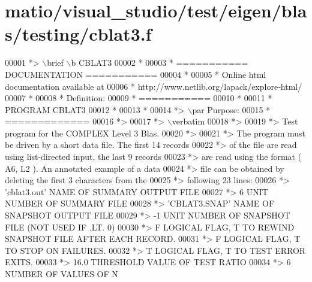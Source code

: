 \hypertarget{matio_2visual__studio_2test_2eigen_2blas_2testing_2cblat3_8f_source}{}\section{matio/visual\+\_\+studio/test/eigen/blas/testing/cblat3.f}
\label{matio_2visual__studio_2test_2eigen_2blas_2testing_2cblat3_8f_source}

\begin{DoxyCode}
00001 \textcolor{comment}{*> \(\backslash\)brief \(\backslash\)b CBLAT3}
00002 \textcolor{comment}{*}
00003 \textcolor{comment}{*  =========== DOCUMENTATION ===========}
00004 \textcolor{comment}{*}
00005 \textcolor{comment}{* Online html documentation available at }
00006 \textcolor{comment}{*            http://www.netlib.org/lapack/explore-html/ }
00007 \textcolor{comment}{*}
00008 \textcolor{comment}{*  Definition:}
00009 \textcolor{comment}{*  ===========}
00010 \textcolor{comment}{*}
00011 \textcolor{comment}{*       PROGRAM CBLAT3}
00012 \textcolor{comment}{* }
00013 \textcolor{comment}{*}
00014 \textcolor{comment}{*> \(\backslash\)par Purpose:}
00015 \textcolor{comment}{*  =============}
00016 \textcolor{comment}{*>}
00017 \textcolor{comment}{*> \(\backslash\)verbatim}
00018 \textcolor{comment}{*>}
00019 \textcolor{comment}{*> Test program for the COMPLEX          Level 3 Blas.}
00020 \textcolor{comment}{*>}
00021 \textcolor{comment}{*> The program must be driven by a short data file. The first 14 records}
00022 \textcolor{comment}{*> of the file are read using list-directed input, the last 9 records}
00023 \textcolor{comment}{*> are read using the format ( A6, L2 ). An annotated example of a data}
00024 \textcolor{comment}{*> file can be obtained by deleting the first 3 characters from the}
00025 \textcolor{comment}{*> following 23 lines:}
00026 \textcolor{comment}{*> 'cblat3.out'      NAME OF SUMMARY OUTPUT FILE}
00027 \textcolor{comment}{*> 6                 UNIT NUMBER OF SUMMARY FILE}
00028 \textcolor{comment}{*> 'CBLAT3.SNAP'     NAME OF SNAPSHOT OUTPUT FILE}
00029 \textcolor{comment}{*> -1                UNIT NUMBER OF SNAPSHOT FILE (NOT USED IF .LT. 0)}
00030 \textcolor{comment}{*> F        LOGICAL FLAG, T TO REWIND SNAPSHOT FILE AFTER EACH RECORD.}
00031 \textcolor{comment}{*> F        LOGICAL FLAG, T TO STOP ON FAILURES.}
00032 \textcolor{comment}{*> T        LOGICAL FLAG, T TO TEST ERROR EXITS.}
00033 \textcolor{comment}{*> 16.0     THRESHOLD VALUE OF TEST RATIO}
00034 \textcolor{comment}{*> 6                 NUMBER OF VALUES OF N}

\end{DoxyCode}
